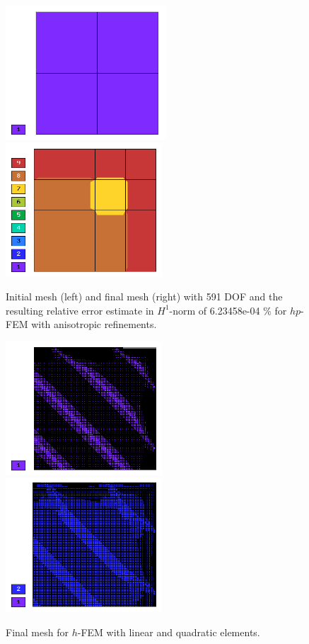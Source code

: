 \begin{figure}[!ht]
\centering
\includegraphics[height=5cm]{nist/nist-6/mesh_hp_aniso_init.png}\ \
\includegraphics[height=5cm]{nist/nist-6/mesh_hp_aniso.png}
\caption{Initial mesh (left) and final mesh (right) with 591 DOF and the resulting relative error estimate in $H^1$-norm of 6.23458e-04 \% for $hp$-FEM with anisotropic refinements.}
\label{fig:nist-6-hp-aniso}
\end{figure}

\begin{figure}[!ht]
\centering
\includegraphics[height=5cm]{nist/nist-6/mesh_h1_aniso.png}\ \
\includegraphics[height=5cm]{nist/nist-6/mesh_h2_aniso.png}
\caption{Final mesh for $h$-FEM with linear and quadratic elements.}
\label{fig:nist-6-h-aniso}
\end{figure}

